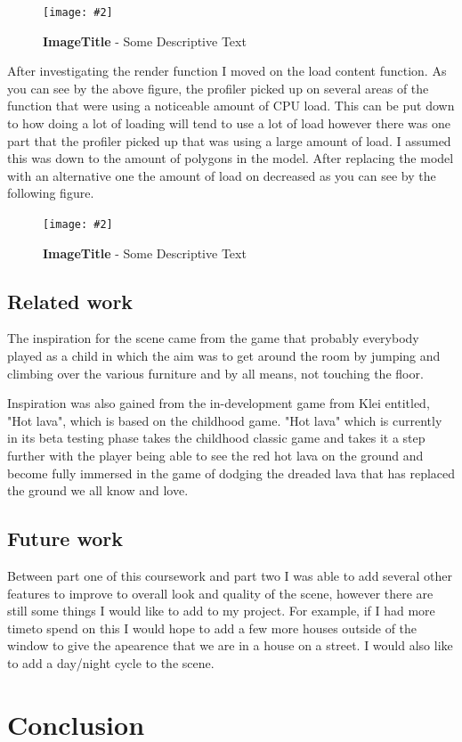 \documentclass[10pt, a4paper]{article}
\newcommand{\figuremacro}[5]{
    \begin{figure}[#1]
        \centering
        \texttt{[image: \#2]}
        \caption[#3]{\textbf{#3}#4}
        \label{fig:#2}
    \end{figure}
}
\begin{document}
\figuremacro{h}{loadcontent.png}{ImageTitle}{ - Some Descriptive Text}{1.0}

After investigating the render function I moved on the load content function. As you can see by the above figure, the profiler picked up on several areas of the function that were using a noticeable 
amount of CPU load. This can be put down to how doing a lot of loading will tend to use a lot of load however there was one part that the profiler picked up that was using a large 
amount of load. I assumed this was down to the amount of polygons in the model. After replacing the model with an alternative one the amount of load on decreased as you can see by the following figure.

\figuremacro{h}{replacementloadcontent.png}{ImageTitle}{ - Some Descriptive Text}{0.8}





   
\subsection{Related work}

The inspiration for the scene came from the game that
probably everybody played as a child in which the aim
was to get around the room by jumping and climbing over
the various furniture and by all means, not touching the
floor.

Inspiration was also gained from the in-development
game from Klei entitled, "Hot lava", which is based on
the childhood game. "Hot lava" which is currently in its
beta testing phase takes the childhood classic game and
takes it a step further with the player being able to see the
red hot lava on the ground and become fully immersed in
the game of dodging the dreaded lava that has replaced
the ground we all know and love.

\subsection{Future work}
Between part one of this coursework and part two I was able to add several other features to improve to overall look and quality of the scene, however there are still some things
I would like to add to my project. For example, if I had more timeto spend on this I would hope to add a few more houses outside of the window to give the apearence that we are in a house on a street.
I would also like to add a day/night cycle to the scene.
\section{Conclusion}	


		
\end{document}
